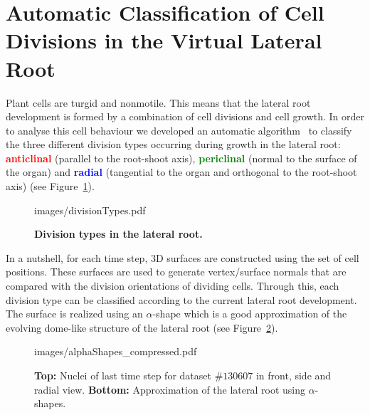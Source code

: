 \documentclass[11pt,a4paper, final]{article}
\begin{document}
\section{Automatic Classification of Cell Divisions in the Virtual Lateral Root}
\label{sec:divisionTypes}
\noindent
Plant cells are turgid and nonmotile. This means that the lateral root development is formed by a combination of cell divisions and cell growth. In order to analyse this cell behaviour we developed an automatic algorithm~\cite[chapter 4]{FangerauDiss_2015} to classify the three different division types occurring during growth in the lateral root: \textcolor{red}{\textbf{anticlinal}} (parallel to the root-shoot axis), \textcolor{green}{\textbf{periclinal}} (normal to the surface of the organ) and \textcolor{blue}{\textbf{radial}} (tangential to the organ and orthogonal to the root-shoot axis) (see Figure~\ref{fig:divisionTypes}).
%
\begin{figure}[htbp]
	\begin{center}
		\begin{overpic}[width=0.8\linewidth]{images/divisionTypes.pdf}
		\end{overpic}
\caption[Division types in the lateral root.]
{
{\bf Division types in the lateral root.}
}
	\label{fig:divisionTypes}
	\end{center}
\end{figure}
%
In a nutshell, for each time step, 3D surfaces are constructed using the set of cell positions. These surfaces are used to generate vertex/surface normals that are compared with the division orientations of dividing cells. Through this, each division type can be classified according to the current lateral root development. The surface is realized using an $\alpha$-shape which is a good approximation of the evolving dome-like structure of the lateral root (see Figure~\ref{fig:alphaShapes}).
%
\begin{figure}[htbp]
	\begin{center}
		\begin{overpic}[width=1.\linewidth]{images/alphaShapes_compressed.pdf}
		\end{overpic}
\caption[Approximation of the lateral root using $\alpha$-shapes.]
{
{\bf Top:} Nuclei of last time step for dataset $\# 130607$ in front, side and radial view. {\bf Bottom:} Approximation of the lateral root using $\alpha$-shapes.
}
	\label{fig:alphaShapes}
	\end{center}
\end{figure}
%
\end{document}
